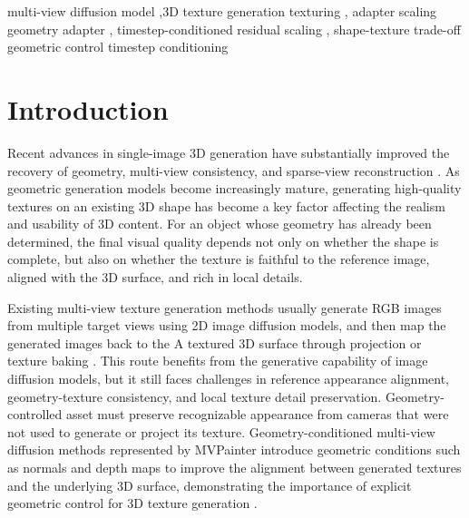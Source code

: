\documentclass[times,twocolumn,final]{elsarticle}
\providecommand{\DIFadd}[1]{{\protect\color{blue} \sf #1}} %
\providecommand{\DIFdel}[1]{{\protect\color{red} \scriptsize #1}} %
\providecommand{\DIFaddbegin}{} %
\providecommand{\DIFaddend}{} %
\providecommand{\DIFdelbegin}{} %
\providecommand{\DIFdelend}{} %
\begin{document}
\begin{frontmatter}
\begin{keyword}
\KWD
multi-view diffusion \DIFdelbegin \DIFdel{model }\DIFdelend \sep 3D \DIFdelbegin \DIFdel{texture generation }\DIFdelend \DIFaddbegin \DIFadd{texturing }\DIFaddend \sep \DIFdelbegin \DIFdel{adapter scaling }\DIFdelend \DIFaddbegin \DIFadd{geometry adapter }\DIFaddend \sep \DIFdelbegin \DIFdel{timestep-conditioned }\DIFdelend \DIFaddbegin \DIFadd{residual }\DIFaddend scaling \sep \DIFdelbegin \DIFdel{shape-texture trade-off }%
\DIFdel{geometric control
}\DIFdelend \DIFaddbegin \DIFadd{timestep conditioning
}\DIFaddend \end{keyword}

\end{frontmatter}

\DIFaddbegin \raggedbottom
\DIFaddend \linenumbers

\section{Introduction}
\label{sec:intro}

\DIFdelbegin \DIFdel{Recent advances in single-image 3D generation have substantially improved the recovery of geometry, multi-view consistency, and sparse-view reconstruction \cite{liu2023zero1to3,shi2023zero123pp,liu2023syncdreamer,long2023wonder3d,shi2024mvdream,wang2023imagedream,xu2024instantmesh,ke2024era3d}. As geometric generation models become increasingly mature, generating high-quality textures on an existing 3D shape has become a key factor affecting the realism and usability of 3D content. For an object whose geometry has already been determined, the final visual quality depends not only on whether the shape is complete, but also on whether the texture is faithful to the reference image, aligned with the 3D surface, and rich in local details. }%

\DIFdel{Existing multi-view texture generation methods usually generate RGB images from multiple target views using 2D image diffusion models, and then map the generated images back to the }\DIFdelend \DIFaddbegin \DIFadd{A textured }\DIFaddend 3D \DIFdelbegin \DIFdel{surface through projection or texture baking \cite{chen2023text2tex,richardson2023texture,poole2023dreamfusion,chen2023fantasia3d}. This route benefits from the generative capability of image diffusion models, but it still faces challenges in reference appearance alignment, geometry-texture consistency, and local texture detail preservation.
Geometry-controlled }\DIFdelend \DIFaddbegin \DIFadd{asset must preserve recognizable appearance from cameras that were not used to generate or project its texture. Geometry-conditioned }\DIFaddend multi-view \DIFdelbegin \DIFdel{diffusion methods represented by MVPainter introduce geometric conditions such as normals and depth maps to improve the alignment between generated textures and the underlying 3D surface, demonstrating the importance of explicit geometric control for 3D texture generation \cite{shao2025mvpainter}. }%
\end{document}
